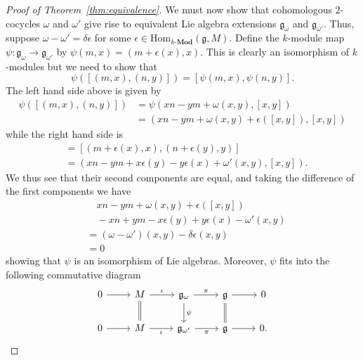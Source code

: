 \begin{proof}[Proof of Theorem~\ref{thm:equivalence}]
  We must now show that cohomologous 2-cocycles $ \omega $ and $ \omega' $ give rise to equivalent Lie algebra extensions $ \mathfrak{g}_\omega $ and $ \mathfrak{g}_{\omega'} $. Thus, suppose $ \omega - \omega' = \delta\epsilon $ for some $ \epsilon \in \text{Hom}_{k\text{-}\mathbf{Mod}}(\mathfrak{g}, M) $. Define the $ k $-module map $ \psi: \mathfrak{g}_{\omega} \to \mathfrak{g}_{\omega'} $ by $ \psi(m, x) = (m + \epsilon(x), x) $. This is clearly an isomorphism of $ k $-modules but we need to show that
  \begin{equation}
    \psi([(m, x), (n, y)]) = [\psi(m, x), \psi(n, y)].
  \end{equation}
  The left hand side above is given by
  \begin{align*}
    \psi([(m, x), (n, y)]) &= \psi(xn - ym + \omega(x, y), [x,y]) \\
                           &= (xn - ym + \omega(x, y) + \epsilon([x,y]), [x,y])
  \end{align*}
  while the right hand side is
  \begin{align*}
    [\psi(m, x), \psi(n, y)] &= [(m + \epsilon(x), x), (n + \epsilon(y), y)] \\
                             &= (xn - ym + x\epsilon(y)- y\epsilon(x) + \omega'(x,y), [x,y])
  .\end{align*}
  We thus see that their second components are equal, and taking the difference of the first components we have
  \begin{align*}
  &\quad xn - ym + \omega(x, y) + \epsilon([x,y]) \\
  &\quad-xn +ym - x\epsilon(y) +y\epsilon(x) - \omega'(x,y) \\
  &= (\omega - \omega')(x, y) - \delta\epsilon(x,y) \\
  &= 0
  \end{align*}
  showing that $ \psi $ is an isomorphism of Lie algebras. Moreover, $ \psi $ fits into the following commutative diagram
  \[\begin{tikzcd}
	  0 & M & {\mathfrak{g}_\omega} & {\mathfrak{g}} & 0 \\
	  0 & M & {\mathfrak{g}_{\omega'}} & {\mathfrak{g}} & 0.
	  \arrow[Rightarrow, no head, from=1-4, to=2-4]
	  \arrow["\psi", from=1-3, to=2-3]
	  \arrow[from=1-1, to=1-2]
	  \arrow["\iota", from=1-2, to=1-3]
	  \arrow["\pi", from=1-3, to=1-4]
	  \arrow[from=1-4, to=1-5]
	  \arrow["{\iota}"', from=2-2, to=2-3]
	  \arrow["{\pi}"', from=2-3, to=2-4]
	  \arrow[from=2-1, to=2-2]
	  \arrow[from=2-4, to=2-5]
	  \arrow[Rightarrow, no head, from=1-2, to=2-2]

\end{tikzcd}\]
\end{proof}
